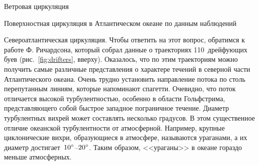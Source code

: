 \begin{chapter}{Ветровая циркуляция}
\begin{section}{Поверхностная циркуляция в Атлантическом океане по данным наблюдений}
\begin{paragraph}{Североатлантическая циркуляция.}
Чтобы ответить на этот вопрос, обратимся к работе Ф. Ричардсона, который
собрал данные о траекториях 110~дрейфующих буев 
(рис.~\ref{fig:drifters}, вверху). Оказалось, что по этим траекториям можно
получить самые различные представления о характере течений в северной части
Атлантического океана. Очень трудно установить направление потока по столь
перепутанным линиям, которые напоминают спагетти. Очевидно, что
поток отличается высокой турбулентностью, особенно в области 
Гольфстрима, 
представляющего собой быстрое западное пограничное течение. 
Диаметр турбулентных вихрей может составлять несколько градусов. В этом
существенное отличие океанской турбулентности 
от атмосферной. Например, крупные циклонические вихри, образующиеся 
в атмосфере, называются ураганами, а их диаметр 
достигает~${10}^\circ$--${20}^\circ$. 
Таким образом, <<ураганы>> в океане гораздо меньше атмосферных.
%


\end{paragraph}
\end{section}
\end{chapter}
